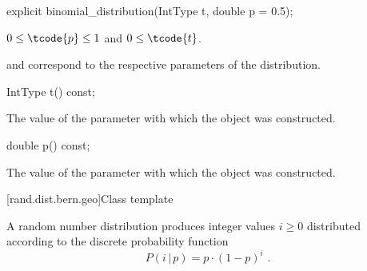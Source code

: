 %
\begin{itemdecl}
explicit binomial_distribution(IntType t, double p = 0.5);
\end{itemdecl}

\begin{itemdescr}
\pnum
\expects
$0 \leq \tcode{p} \leq 1$ and $0 \leq \tcode{t} $.

\pnum
\remarks
  and 
 correspond to the respective parameters of the distribution.
\end{itemdescr}

%
\begin{itemdecl}
IntType t() const;
\end{itemdecl}%
\begin{itemdescr}
\pnum
\returns
The value of the  parameter
 with which the object was constructed.
\end{itemdescr}

%
\begin{itemdecl}
double p() const;
\end{itemdecl}

\begin{itemdescr}
\pnum
\returns
The value of the  parameter
 with which the object was constructed.
\end{itemdescr}


[rand.dist.bern.geo]{Class template }
%
%

\pnum
A  random number distribution
produces integer values $i \geq 0$
distributed according to
the discrete probability function
%
%
\[ P(i\,|\,p) = p \cdot (1-p)^{i} \text{ .} \]


